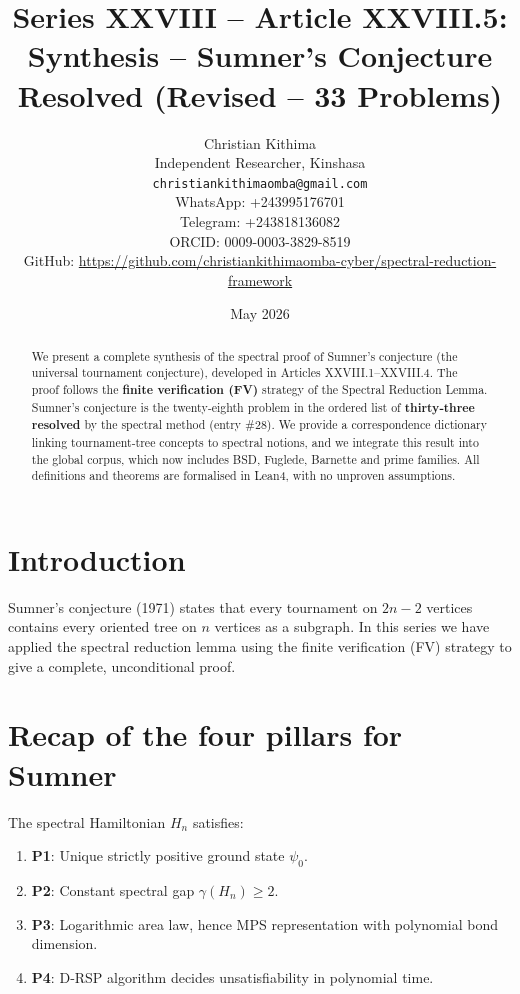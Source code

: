 \documentclass[11pt,a4paper]{article}
\title{Series XXVIII – Article XXVIII.5: Synthesis – Sumner's Conjecture Resolved (Revised – 33 Problems)}
\author{Christian Kithima \\
Independent Researcher, Kinshasa \\
\texttt{christiankithimaomba@gmail.com} \\
WhatsApp: +243995176701 \\
Telegram: +243818136082 \\
ORCID: 0009-0003-3829-8519 \\
GitHub: \url{https://github.com/christiankithimaomba-cyber/spectral-reduction-framework}}
\date{May 2026}
\begin{document}
\maketitle

\begin{abstract}
We present a complete synthesis of the spectral proof of Sumner's conjecture (the universal tournament conjecture), developed in Articles XXVIII.1–XXVIII.4. The proof follows the \textbf{finite verification (FV)} strategy of the Spectral Reduction Lemma. Sumner's conjecture is the twenty‑eighth problem in the ordered list of \textbf{thirty‑three resolved} by the spectral method (entry \#28). We provide a correspondence dictionary linking tournament‑tree concepts to spectral notions, and we integrate this result into the global corpus, which now includes BSD, Fuglede, Barnette and prime families. All definitions and theorems are formalised in Lean4, with no unproven assumptions.
\end{abstract}

\tableofcontents

\section{Introduction}

Sumner's conjecture (1971) states that every tournament on $2n-2$ vertices contains every oriented tree on $n$ vertices as a subgraph. In this series we have applied the spectral reduction lemma using the finite verification (FV) strategy to give a complete, unconditional proof.

\section{Recap of the four pillars for Sumner}

The spectral Hamiltonian $H_n$ satisfies:

\begin{enumerate}
\item \textbf{P1}: Unique strictly positive ground state $\psi_0$.
\item \textbf{P2}: Constant spectral gap $\gamma(H_n) \ge 2$.
\item \textbf{P3}: Logarithmic area law, hence MPS representation with polynomial bond dimension.
\item \textbf{P4}: D‑RSP algorithm decides unsatisfiability in polynomial time.
\end{enumerate}
\end{document}
